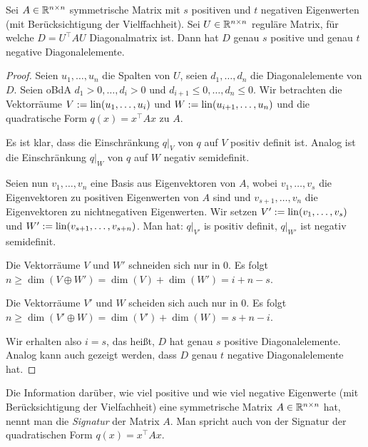 \begin{thm}
	Sei $A \in \mathbb R^{n \times n}$ symmetrische Matrix mit $s$ positiven und $t$ negativen Eigenwerten (mit Berücksichtigung der Vielffachheit). Sei $U \in \mathbb R^{n \times n}$ reguläre Matrix, für welche $D=U^\top A U$ Diagonalmatrix ist. Dann hat $D$ genau $s$ positive und genau $t$ negative Diagonalelemente.
\end{thm} 
\begin{proof} 
	Seien $u_1,\ldots,u_n$ die Spalten von $U$, seien $d_1,\ldots,d_n$ die Diagonalelemente von $D$. Seien oBdA $d_1 >0,\ldots,d_i>0$ und  $d_{i+1} \le 0,\ldots, d_n \le 0$. Wir betrachten die Vektorräume $V := \operatorname{lin}(u_1,\ldots,u_i)$ und $W  := \operatorname{lin}(u_{i+1},\ldots,u_n)$ und die quadratische Form $q(x) = x^\top A x$ zu $A$. 
	
	Es ist klar, dass die Einschränkung $q|_{V}$ von $q$ auf $V$ positiv definit ist. Analog ist die Einschränkung $q|_{W}$ von $q$ auf $W$ negativ semidefinit. 
	
	Seien nun $v_1,\ldots,v_n$ eine Basis aus Eigenvektoren von $A$, wobei $v_1,\ldots,v_s$ die Eigenvektoren zu positiven Eigenwerten von $A$ sind und $v_{s+1},\ldots,v_n$ die Eigenvektoren zu nichtnegativen Eigenwerten. Wir setzen $V' := \operatorname{lin}(v_1,\ldots,v_s)$ und $W' := \operatorname{lin}(v_{s+1},\ldots,v_{s+n})$. Man hat: $q|_{V'}$ is positiv definit, $q|_{W'}$ ist negativ semidefinit. 
	
	Die Vektorräume $V$ und $W'$ schneiden sich nur in $0$. Es folgt $n \ge \dim(V \oplus W') = \dim(V) +\dim(W') = i + n- s$. 
	
	Die Vektorräume $V'$ und $W$ scheiden sich auch nur in $0$.  Es folgt $n \ge \dim(V' \oplus W) = \dim(V') + \dim(W) = s + n - i$. 
	
	Wir erhalten also $i=s$, das heißt, $D$ hat genau $s$ positive Diagonalelemente. Analog kann auch gezeigt werden, dass $D$ genau $t$ negative Diagonalelemente hat. 
\end{proof} 

Die Information darüber, wie viel positive und wie viel negative Eigenwerte (mit Berücksichtigung der Vielfachheit) eine symmetrische Matrix $A \in \mathbb R^{n \times n}$ hat, nennt man die \emph{Signatur} der Matrix $A$. Man spricht auch von der Signatur der quadratischen Form $q(x) = x^\top A x$. 
